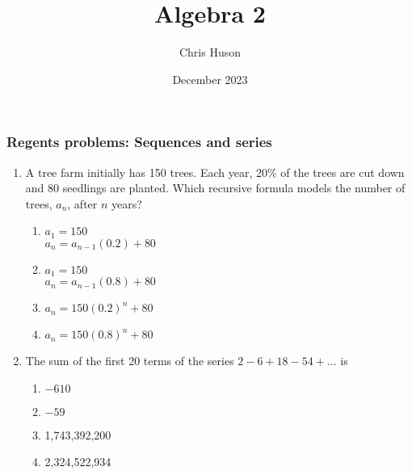 \documentclass[12pt, twoside]{article}
\title{Algebra 2}
\author{Chris Huson}
\date{December 2023}
\begin{document}
\subsubsection*{Regents problems: Sequences and series}
\begin{enumerate}[itemsep=0.5cm]
\item A tree farm initially has 150 trees. Each year, 20\% of the trees are cut down and 80 seedlings are planted. Which recursive formula models the number of trees, $a_n$, after $n$ years?
\begin{enumerate}
    \item $a_1 = 150$ \\ $a_n = a_{n-1}(0.2) + 80$
    \item $a_1 = 150$ \\ $a_n = a_{n-1}(0.8) + 80$
    \item $a_n = 150(0.2)^n + 80$
    \item $a_n = 150(0.8)^n + 80$
\end{enumerate}

\item The sum of the first 20 terms of the series \(2 - 6 + 18 - 54 + \ldots\) is
\begin{enumerate}
    \item $-610$
    \item $-59$
    \item 1,743,392,200
    \item 2,324,522,934
\end{enumerate}


\end{enumerate}
\end{document}
